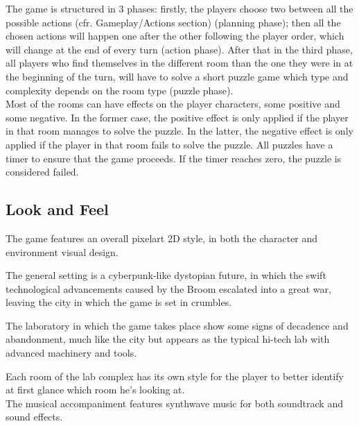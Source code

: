 The game is structured in 3 phases: firstly, the players choose two between all the possible actions (cfr. Gameplay/Actions section)  (planning phase);
then all the chosen actions will happen one after the other following the player order, which will change at the end of every turn (action phase). After that in the third phase, all players who find themselves in the different room than the one they were in at the beginning of the turn, will have to solve a short puzzle game which type and complexity depends on the room type (puzzle phase). \\

Most of the rooms can have effects on the player characters, some positive and some negative. In the former case, the positive effect is only applied if the player in that room manages to solve the puzzle. In the latter, the negative effect is only applied if the player in that room fails to solve the puzzle. All puzzles have a timer to ensure that the game proceeds. If the timer reaches zero, the puzzle is considered failed. 

\pagebreak

\subsection{Look and Feel}

The game features an overall pixelart 2D style, in both the character and environment visual design. 




The general setting is a cyberpunk-like dystopian future, in which the swift technological advancements caused by the Broom escalated into a great war, leaving the city in which the game is set in crumbles.

The laboratory in which the game takes place show some signs of decadence and abandonment, much like the city but appears as the typical hi-tech lab with advanced machinery and tools.


Each room of the lab complex has its own style for the player to better identify at first glance which room he's looking at. \\

The musical accompaniment features synthwave music for both soundtrack and sound effects.

\clearpage 